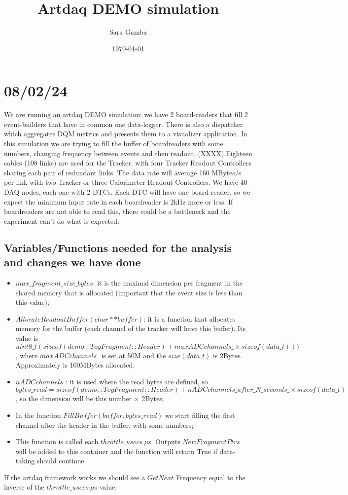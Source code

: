 \documentclass{article}
\title{Artdaq DEMO simulation}
\author{Sara Gamba}
\date{\today}
\begin{document}
\maketitle

\section{08/02/24}
We are running an artdaq DEMO simulation: we have 2 board-readers that fill 2 event-builders that have in common one data-logger. There is also a dispatcher which aggregates DQM metrics and presents them to a visualizer application.
In this simulation we are trying to fill the buffer of boardreaders with some numbers, changing frequency between events and then readout.
(XXXX).Eighteen cables (108 links) are used for the Tracker, with four Tracker Readout Controllers sharing each pair of redundant links. The data rate will average 160 MBytes/s per link with two Tracker or three Calorimeter Readout Controllers. We have 40 DAQ nodes, each one with 2 DTCs. Each DTC will have one board-reader, so we expect the minimum input rate in each boardreader is 2kHz more or less. If boardreaders are not able to read this, there could be a bottleneck and the experiment can't do what is expected.
\subsection{Variables/Functions needed for the analysis and changes we have done}
\begin{itemize}
    \item  $max\_fragment\_size\_bytes$: it is the maximal dimension per fragment in the shared memory that is allocated (important that the event size is less than this value);
    \item $AllocateReadoutBuffer(char** buffer)$: it is a function that allocates memory for the buffer (each channel of the tracker will have this buffer). Its value is $uint8\_t(sizeof(demo::ToyFragment::Header) + maxADCchannels\_ \times sizeof(data\_t)))$, where $maxADCchannels\_$ is set at 50M and the $size(data\_t)$ is 2Bytes. Approximately is 100MBytes allocated;
    \item $nADCchannels\_$: it is used where the read bytes are defined, so $bytes\_read = sizeof(demo::ToyFragment::Header) + nADCchannels\_after\_N\_seconds\_ \times sizeof(data\_t)$, so the dimension will be this number $\times$ 2Bytes;
    \item In the function $FillBuffer(buffer,bytes\_read)$ we start filling the first channel after the header in the buffer, with some numbers;
    \item This function is called each $throttle\_ usecs \ \mu$s. Outputs $New FragmentPtrs$ will be added to this container and the function will return True if data-taking should continue.
\end{itemize}
If the artdaq framework works we should see a $GetNext$ Frequency equal to the inverse of the $throttle\_ usecs \ \mu$s value.
\end{document}
